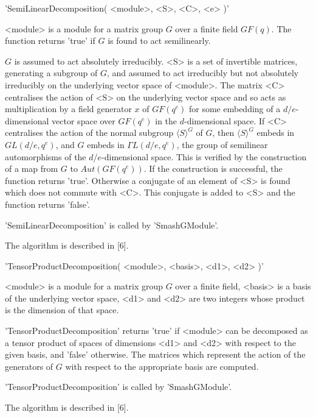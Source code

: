 'SemiLinearDecomposition( <module>, <S>, <C>, <e> )'

<module> is a module for a matrix group $G$ over  a finite field $GF(q)$.
The function returns 'true' if $G$ is found to act semilinearly.

$G$ is assumed to act absolutely irreducibly. <S> is  a set of invertible
matrices,  generating a subgroup of $G$, and  assumed to act  irreducibly
but  not  absolutely  irreducibly  on  the  underlying  vector  space  of
<module>.  The matrix <C> centralises the action of <S> on the underlying
vector space and so acts as  multiplication  by  a field generator $x$ of
$GF(q^e)$ for some embedding  of  a  $d/e$-dimensional  vector space over
$GF(q^e)$ in the $d$-dimensional space.  If <C> centralises the action of
the normal  subgroup  $\langle  S \rangle ^G$  of  $G$, then  $\langle  S
\rangle  ^G$   embeds  in  $GL(d/e,q^e)$,  and  $G$  embeds  in   $\Gamma
L(d/e,q^e)$,   the   group   of   semilinear    automorphisms    of   the
$d/e$-dimensional space.  This is verified  by the  construction of a map
from $G$ to  $Aut(GF(q^e))$.   If  the  construction  is  successful, the
function returns 'true'.  Otherwise a  conjugate  of an element of <S> is
found which does not  commute  with <C>.  This  conjugate is added to <S>
and the function returns 'false'.

'SemiLinearDecomposition' is called by 'SmashGModule'.

The algorithm is described in [6].


'TensorProductDecomposition( <module>, <basis>, <d1>, <d2> )'

<module> is a module for a matrix group $G$  over a finite field, <basis>
is a basis of the underlying vector space, <d1> and <d2> are two integers
whose product is the dimension of that space.

'TensorProductDecomposition' returns 'true' if <module> can be decomposed
as a tensor product of spaces of dimensions <d1> and <d2> with respect to
the given basis, and 'false' otherwise.  The matrices which represent the
action of the generators of $G$ with respect to the appropriate basis are
computed.

'TensorProductDecomposition' is called by 'SmashGModule'.

The algorithm is described in [6].


